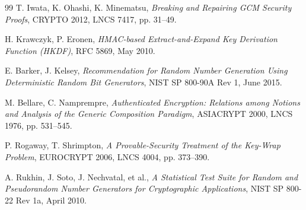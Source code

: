 \documentclass[11pt,a4paper]{article}
\begin{document}
\begin{thebibliography}{99}
  T. Iwata, K. Ohashi, K. Minematsu,
  \emph{Breaking and Repairing GCM Security Proofs},
  CRYPTO 2012, LNCS 7417, pp. 31--49.

  H. Krawczyk, P. Eronen,
  \emph{HMAC-based Extract-and-Expand Key Derivation Function (HKDF)},
  RFC 5869, May 2010.

  E. Barker, J. Kelsey,
  \emph{Recommendation for Random Number Generation Using Deterministic Random Bit Generators},
  NIST SP 800-90A Rev 1, June 2015.

  M. Bellare, C. Namprempre,
  \emph{Authenticated Encryption: Relations among Notions and Analysis of the Generic Composition Paradigm},
  ASIACRYPT 2000, LNCS 1976, pp. 531--545.

  P. Rogaway, T. Shrimpton,
  \emph{A Provable-Security Treatment of the Key-Wrap Problem},
  EUROCRYPT 2006, LNCS 4004, pp. 373--390.

  A. Rukhin, J. Soto, J. Nechvatal, et al.,
  \emph{A Statistical Test Suite for Random and Pseudorandom Number Generators for Cryptographic Applications},
  NIST SP 800-22 Rev 1a, April 2010.

\end{thebibliography}
\end{document}
